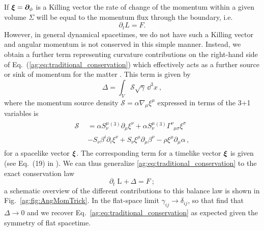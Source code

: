 If $\boldsymbol{\xi} = \boldsymbol{\partial}_\phi$ is a Killing vector the rate of change of the momentum
within a given volume $\Sigma$ will be equal to the momentum flux through the
boundary, i.e.
\begin{equation} \label{ag:eq:traditional_conservation}
    \partial_t {L} = {F}.
\end{equation}
However, in general dynamical spacetimes, we do not have such
a Killing vector and angular momentum is not conserved in this simple manner. 
Instead, we obtain a further term representing curvature contributions on the right-hand side of Eq.~(\ref{ag:eq:traditional_conservation})
which effectively acts as a further source or sink of momentum for the matter \cite{Croft:2022gks,Clough:2021qlv}. This term is given by
\begin{equation}
    \mathbin{{\Delta = \int_{V} \mathcal{S} \sqrt{\gamma }\,
    \dd^3x}}~,
\end{equation}
where the momentum source density $\mathcal{S}=\alpha\nabla_{\mu}\xi^{\mu}$ expressed in terms
of the 3+1 variables is
\begin{align}
    \begin{split}\mathcal{S} &= \alpha S^\mu_{\nu}{}^{(3)}\partial_\mu \xi^\nu + \alpha S^\mu_{\nu} {}^{(3)}\Gamma^\nu_{\,\,\,\mu \sigma} \xi^\sigma \\ \quad &- S_\nu \beta^i \partial_i \xi^\nu  + S_\nu \xi^\mu \partial_\mu \beta^\nu - \rho \xi^\mu \partial_\mu \alpha\,, \end{split}
\end{align}
for a spacelike vector $\boldsymbol\xi$. The corresponding term
for a timelike vector $\boldsymbol\xi$ is given (see Eq.~(19) in \cite{Clough:2021qlv}).
We can thus generalize \ref{ag:eq:traditional_conservation} to the exact conservation law
\begin{equation}
    \partial_t\mathbin{{L}} +\,
    \mathbin{{\Delta}} =
    \mathbin{F}~;\label{ag:eqn:conserved_ang}
\end{equation} 
a schematic overview of the different contributions to this balance
law is shown in Fig.~\ref{ag:fig:AngMomTrick}. In the flat-space limit $\gamma_{ij}
\rightarrow \delta_{ij}$, so that
find that ${{\Delta}}\rightarrow 0$ and we recover Eq.~\ref{ag:eq:traditional_conservation} as expected given the
symmetry of flat spacetime.


